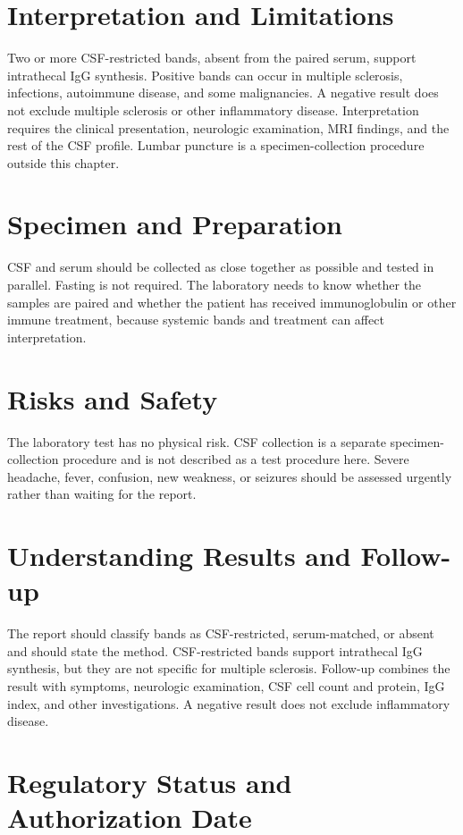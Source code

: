 \section*{Interpretation and Limitations}
Two or more CSF-restricted bands, absent from the paired serum, support intrathecal IgG synthesis. Positive bands can occur in multiple sclerosis, infections, autoimmune disease, and some malignancies. A negative result does not exclude multiple sclerosis or other inflammatory disease. Interpretation requires the clinical presentation, neurologic examination, MRI findings, and the rest of the CSF profile. Lumbar puncture is a specimen-collection procedure outside this chapter.
\section*{Specimen and Preparation}
CSF and serum should be collected as close together as possible and tested in parallel. Fasting is not required. The laboratory needs to know whether the samples are paired and whether the patient has received immunoglobulin or other immune treatment, because systemic bands and treatment can affect interpretation.

\section*{Risks and Safety}
The laboratory test has no physical risk. CSF collection is a separate specimen-collection procedure and is not described as a test procedure here. Severe headache, fever, confusion, new weakness, or seizures should be assessed urgently rather than waiting for the report.

\section*{Understanding Results and Follow-up}
The report should classify bands as CSF-restricted, serum-matched, or absent and should state the method. CSF-restricted bands support intrathecal IgG synthesis, but they are not specific for multiple sclerosis. Follow-up combines the result with symptoms, neurologic examination, CSF cell count and protein, IgG index, and other investigations. A negative result does not exclude inflammatory disease.

\section*{Regulatory Status and Authorization Date}

\clearpage
